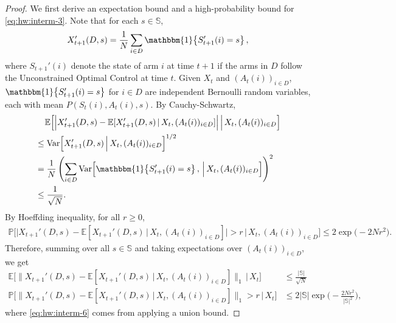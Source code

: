 \documentclass[11pt,letterpaper]{article}
\theoremstyle{plain}
\theoremstyle{definition}
\theoremstyle{remark}
\newcommand{\normBig}[1]{\Big\lVert#1\Big\rVert}
\newcommand{\Eplain}[1]{\mathbb{E}[#1]}
\newcommand{\EBig}[1]{\mathbb{E}\Big[#1\Big]}
\newcommand{\givenplain}{\,|\,}
\newcommand{\givenBig}{\,\Big|\,}
\newcommand{\Var}[1]{\text{Var}{\left[#1\right]}}
\newcommand{\ProbBig}[1]{\mathbb{P}\Big[#1\Big]}
\newcommand{\indibrac}[1]{\mathbbm{1}\!\left\{#1\right\}}
\newcommand{\absBig}[1]{\Big\lvert#1\Big\rvert}
\newcommand{\sspa}{\mathbb{S}}
\begin{document}
\begin{proof}
    We first derive an expectation bound and a high-probability bound for \eqref{eq:hw:interm-3}. 
    Note that for each $s\in\sspa$,
    \begin{align*}
        X_{t+1}'(D, s) = \frac{1}{N} \sum_{i\in D} \indibrac{S_{t+1}'(i) = s},
    \end{align*}
    where $S_{t+1}'(i)$ denote the state of arm $i$ at time $t+1$ if the arms in $D$ follow the Unconstrained Optimal Control at time $t$.
    Given $X_t$ and $(A_t(i))_{i\in D}$, $\indibrac{S_{t+1}'(i) = s}$ for $i\in D$ are independent Bernoulli random variables, each with mean $P(S_t(i), A_t(i), s)$. 
    By Cauchy-Schwartz, 
    \begin{align}
        \nonumber
        &\mspace{20mu} \EBig{\absBig{ X_{t+1}'(D, s) - \Eplain{X_{t+1}'(D, s) \givenplain X_t, (A_t(i))_{i\in D}}} \givenBig X_t, (A_t(i))_{i\in D}}  \\
        \nonumber
        &\leq  \Var{X_{t+1}'(D, s) \givenBig X_t, (A_t(i))_{i\in D}}^{1/2} \\
        \nonumber
        &= \frac{1}{N} \left(\sum_{i\in D} \Var{\indibrac{S_{t+1}'(i) = s}, \givenBig X_t, (A_t(i))_{i\in D}} \right)^2 \\
        \nonumber
        &\leq \frac{1}{\sqrt{N}}. 
    \end{align}
    By Hoeffding inequality, for all $r\geq 0$, 
    \begin{align}
        \nonumber
        \ProbBig{\absBig{ X_{t+1}'(D, s) - \Eplain{X_{t+1}'(D, s) \givenplain X_t, (A_t(i))_{i\in D}}} > r \givenBig X_t, (A_t(i))_{i\in D}} \leq 2\exp\big(-2N r^2\big). 
    \end{align}
    Therefore, summing over all $s\in\sspa$ and taking expectations over $(A_t(i))_{i\in D}$, we get
    \begin{align}
        \label{eq:hw:interm-5}
         \EBig{\normBig{ X_{t+1}'(D, s) - \Eplain{X_{t+1}'(D, s) \givenplain X_t, (A_t(i))_{i\in D}}}_1 \givenBig X_t} &\leq \frac{|\sspa|}{\sqrt{N}} \\
         \label{eq:hw:interm-6}
         \ProbBig{\normBig{ X_{t+1}'(D, s) - \Eplain{X_{t+1}'(D, s) \givenplain X_t, (A_t(i))_{i\in D}}}_1 > r \givenBig X_t} &\leq 2|\sspa|\exp\Big(-\frac{2N r^2}{|\sspa|^2}\Big),
    \end{align}
    where \eqref{eq:hw:interm-6} comes from applying a union bound. 


\end{proof}
\end{document}
